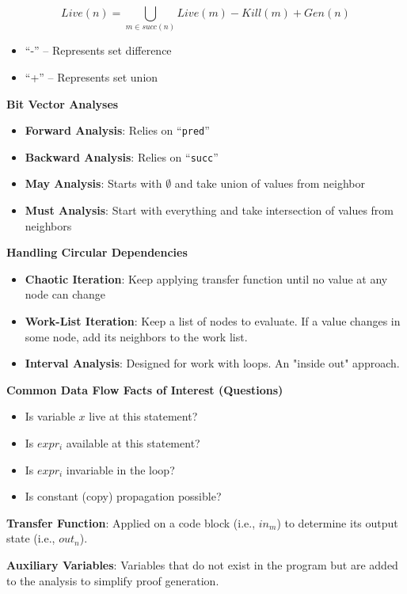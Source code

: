 \documentclass[10pt,twocolumn]{report}
\begin{document}
\begin{equation}
  Live(n) = \bigcup_{m\in succ(n)}Live(m) - Kill(m) + Gen(n)
\end{equation}
\begin{itemize}
  \item ``-'' -- Represents set difference
  \item ``+'' -- Represents set union
\end{itemize}

\textbf{Bit Vector Analyses}
\begin{itemize}
  \item \textbf{Forward Analysis}: Relies on ``\texttt{pred}''
  \item \textbf{Backward Analysis}: Relies on ``\texttt{succ}''
  \item \textbf{May Analysis}: Starts with $\emptyset$ and take union of values from neighbor
  \item \textbf{Must Analysis}: Start with everything and take intersection of values from neighbors
\end{itemize}

\textbf{Handling Circular Dependencies}
\begin{itemize}
  \item \textbf{Chaotic Iteration}: Keep applying transfer function until no value at any node can change
  \item \textbf{Work-List Iteration}: Keep a list of nodes to evaluate. If a value changes in some node, add its neighbors to the work list.
  \item \textbf{Interval Analysis}: Designed for work with loops. An "inside out" approach.
\end{itemize}

\textbf{Common Data Flow Facts of Interest (Questions)}
\begin{itemize}
  \item Is variable $x$ live at this statement?
  \item Is $expr_i$ available at this statement?
  \item Is $expr_i$ invariable in the loop?
  \item Is constant (copy) propagation possible?
\end{itemize}

\textbf{Transfer Function}: Applied on a code block (i.e., $in_m$) to determine its output state (i.e., $out_n$).

\textbf{Auxiliary Variables}: Variables that do not exist in the program but are added to the analysis to simplify proof generation.
\end{document}
